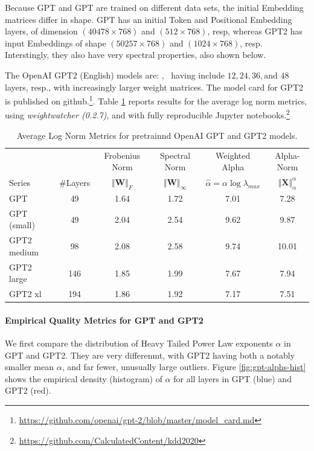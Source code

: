 Because GPT and GPT are trained on different data sets, the initial Embedding matrices differ in shape.
GPT  has an initial Token and Positional Embedding layers, of dimension
$(40478\times 768)$ and $(512\times 768)$, resp, whereas GPT2 has input Embeddings of shape
$(50257\times 768)$ and $(1024\times 768)$, resp.  Interstingly, they also have very spectral properties,
also shown below.

The OpenAI GPT2 (English) models are: , \
having include $12, 24, 36, \text{and }48$ layers, resp., with increasingly larger weight matrices.
The model card for GPT2 is published on github.\footnote{\url{https://github.com/openai/gpt-2/blob/master/model_card.md}}.
Table \ref{table:nlp} reports results for the average log norm metrics, using \emph{weightwatcher (0.2.7)},
and with fully reproducible Jupyter notebooks.\footnote{\url{https://github.com/CalculatedContent/kdd2020}}


\begin{table}[t]
\small
\begin{center}
\begin{tabular}{|p{1in}|c|c|c|c|c|}
\hline
   &    & Frobenius Norm & Spectral Norm & Weighted Alpha & Alpha-Norm \\
 Series & \#Layers   & $\Vert\mathbf{W}\Vert_{F}$ & $\Vert\mathbf{W}\Vert_{\infty}$ & $\hat{\alpha}=\alpha\log\lambda_{max}$ & $\Vert\mathbf{X}\Vert^{\alpha}_{\alpha}$ \\
\hline
GPT & 49 & 1.64  & 1.72 & 7.01 & 7.28 \\
GPT (small) & 49 & 2.04  & 2.54& 9.62 & 9.87 \\
GPT2 medium & 98 & 2.08 & 2.58& 9.74 & 10.01 \\
GPT2 large & 146 & 1.85 & 1.99& 7.67 & 7.94 \\
GPT2 xl & 194 & 1.86 & 1.92 & 7.17 & 7.51 \\
\hline
\end{tabular}
\end{center}
\caption{Average Log Norm Metrics for pretrainnd OpenAI GPT and GPT2 models.}
\label{table:nlp}
\end{table}


\paragraph{Empirical Quality Metrics for GPT and GPT2}
We first compare the distribution of  Heavy Tailed Power Law exponents $\alpha$ in GPT and GPT2.
They are very differenmt, with GPT2 having both a notably smaller mean $\alpha$, and far fewer, unusually large outliers.
Figure \ref{fig:gpt-alphs-hist} shows the empirical density (histogram) of $\alpha$
for all layers in GPT (blue) and GPT2 (red).  \charles{discuss more}

